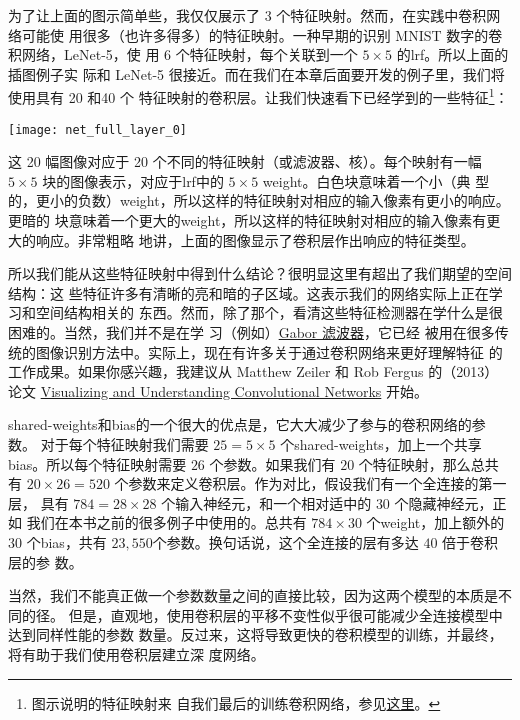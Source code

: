为了让上面的图示简单些，我仅仅展示了 3 个特征映射。然而，在实践中卷积网络可能使
用很多（也许多得多）的特征映射。一种早期的识别 MNIST 数字的卷积网络，LeNet-5，使
用 6 个特征映射，每个关联到一个 $5 \times 5$ 的\gls*{lrf}。所以上面的插图例子实
际和 LeNet-5 很接近。而在我们在本章后面要开发的例子里，我们将使用具有 20 和40 个
特征映射的卷积层。让我们快速看下已经学到的一些特征\footnote{图示说明的特征映射来
  自我们最后的训练卷积网络，参见\hyperref[final_conv]{这里}。}：
\begin{center}
  \texttt{[image: net\_full\_layer\_0]}
\end{center}

这 20 幅图像对应于 20 个不同的特征映射（或滤波器、核）。每个映射有一幅 $5 \times
5$ 块的图像表示，对应于\gls*{lrf}中的 $5 \times 5$ \gls*{weight}。白色块意味着一个小（典
  型的，更小的负数）\gls*{weight}，所以这样的特征映射对相应的输入像素有更小的响应。更暗的
块意味着一个更大的\gls*{weight}，所以这样的特征映射对相应的输入像素有更大的响应。非常粗略
地讲，上面的图像显示了卷积层作出响应的特征类型。

所以我们能从这些特征映射中得到什么结论？很明显这里有超出了我们期望的空间结构：这
些特征许多有清晰的亮和暗的子区域。这表示我们的网络实际上正在学习和空间结构相关的
东西。然而，除了那个，看清这些特征检测器在学什么是很困难的。当然，我们并不是在学
习（例如）\href{http://en.wikipedia.org/wiki/Gabor_filter}{Gabor 滤波器}，它已经
被用在很多传统的图像识别方法中。实际上，现在有许多关于通过卷积网络来更好理解特征
的工作成果。如果你感兴趣，我建议从 Matthew Zeiler 和 Rob Fergus 的（2013）论文
\href{http://arxiv.org/abs/1311.2901}{Visualizing and Understanding
  Convolutional Networks} 开始。

\gls*{shared-weights}和\gls*{bias}的一个很大的优点是，它大大减少了参与的卷积网络的参数。
对于每个特征映射我们需要 $25 = 5 \times 5$ 个\gls*{shared-weights}，加上一个共享
\gls*{bias}。所以每个特征映射需要 $26$ 个参数。如果我们有 $20$ 个特征映射，那么总共有
$20 \times 26 = 520$ 个参数来定义卷积层。作为对比，假设我们有一个全连接的第一层，
具有 $784 = 28 \times 28$ 个输入神经元，和一个相对适中的 $30$ 个隐藏神经元，正如
我们在本书之前的很多例子中使用的。总共有 $784 \times 30$ 个\gls*{weight}，加上额外的 $30$
个\gls*{bias}，共有 $23,550$个参数。换句话说，这个全连接的层有多达 $40$ 倍于卷积层的参
数。

当然，我们不能真正做一个参数数量之间的直接比较，因为这两个模型的本质是不同的径。
但是，直观地，使用卷积层的平移不变性似乎很可能减少全连接模型中达到同样性能的参数
数量。反过来，这将导致更快的卷积模型的训练，并最终，将有助于我们使用卷积层建立深
度网络。

